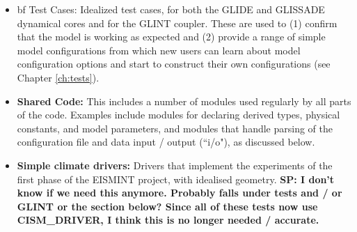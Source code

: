 \begin{itemize}
\item {bf Test Cases:} Idealized test cases, for both the GLIDE and GLISSADE dynamical cores and for the GLINT coupler. These are used to (1) confirm that the model is working as expected and (2) provide a range of simple model configurations from which new users can learn about model configuration options and start to construct their own configurations (see Chapter \ref{ch:tests}). 

\item {\bf Shared Code:} This includes a number of modules used regularly by all parts of the code. Examples include modules for declaring derived types, physical constants, and model parameters, and modules that handle parsing of the configuration file and data input / output (``i/o"), as discussed below.

\item {\bf Simple climate drivers:} Drivers that implement the experiments of the first phase of the EISMINT project, with idealised geometry. \textbf{SP: I don't know if we need this anymore. Probably falls under tests and / or GLINT or the section below? Since all of these tests now use CISM\_DRIVER, I think this is no longer needed / accurate.}

\end{itemize}
%

%
